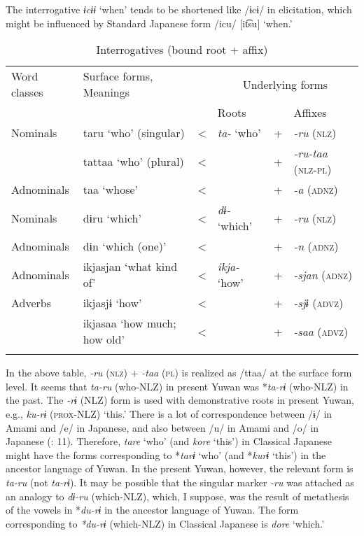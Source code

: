 The interrogative \textit{ɨcɨɨ} ‘when’ tends to be shortened like /ɨcɨ/ in elicitation, which might be influenced by Standard Japanese form /icu/ [it͡su] ‘when.’

\begin{table}
\caption{\label{tab:key:39}Interrogatives (bound root + affix)}
\begin{tabular}{ll@{ }c@{ }l@{ }c@{ }l}
\lsptoprule
Word classes &   Surface forms,  Meanings & & \multicolumn{3}{c}{Underlying forms}\\\cmidrule{4-6}
             &                            & & Roots & &   Affixes\\\midrule

Nominals    & taru    ‘who’ (singular)       & < & \textit{ta-}  ‘who’    & + & \textit{{}-ru}  (\textsc{nlz})\\
            & tattaa  ‘who’ (plural)         & < &                        & + & \textit{{}-ru-taa}  (\textsc{nlz}-\textsc{pl})\\
Adnominals  & taa     ‘whose’                & < &                        & + & \textit{{}-a} (\textsc{adnz})\\
Nominals    & dɨru    ‘which’                & < & \textit{dɨ-}  ‘which’  & + & \textit{{}-ru} (\textsc{nlz})\\
Adnominals  & dɨn     ‘which (one)’          & < &                        & + & \textit{{}-n} (\textsc{adnz})\\
Adnominals  & ikjasjan ‘what kind of’        & < & \textit{ikja-}  ‘how’  & + & \textit{{}-sjan} (\textsc{adnz})\\
Adverbs     & ikjasjɨ  ‘how’                 & < &                        & + & \textit{{}-sjɨ} (\textsc{advz}) \\
            & ikjasaa  ‘how much; how old’   & < &                        & + & \textit{{}-saa} (\textsc{advz}) \\
\lspbottomrule
\end{tabular}
\end{table}

In the above table, \textit{{}-ru} (\textsc{nlz}) + \textit{{}-taa} (\textsc{pl}) is realized as /ttaa/ at the surface form level. It seems that \textit{ta-ru} (who-NLZ) in present Yuwan was *\textit{ta-rɨ} (who-NLZ) in the past. The \textit{{}-rɨ} (NLZ) form is used with demonstrative roots in present Yuwan, e.g., \textit{ku-rɨ} (\textsc{prox}-NLZ) ‘this.’ There is a lot of correspondence between /ɨ/ in Amami and /e/ in Japanese, and also between /u/ in Amami and /o/ in Japanese (\citealt{HirayamaEtAl1966}: 11). Therefore, \textit{tare} ‘who’ (and \textit{kore} ‘this’) in Classical Japanese might have the forms corresponding to *\textit{tarɨ} ‘who’ (and *\textit{kurɨ} ‘this’) in the ancestor language of Yuwan. In the present Yuwan, however, the relevant form is \textit{ta-ru} (not \textit{ta-rɨ}). It may be possible that the singular marker \textit{-ru} was attached as an analogy to \textit{dɨ-ru} (which-NLZ), which, I suppose, was the result of metathesis of the vowels in *\textit{du-rɨ} in the ancestor language of Yuwan. The form corresponding to \textit{*du-rɨ} (which-NLZ) in Classical Japanese is \textit{dore} ‘which.’

